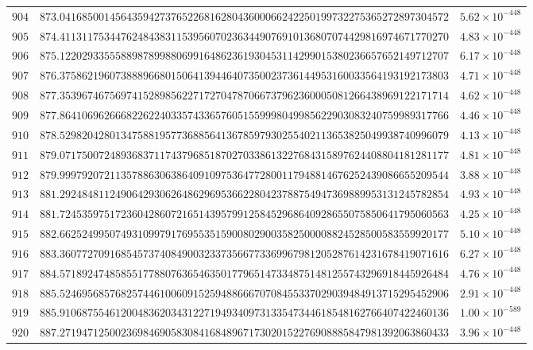\documentclass[12pt,reqno]{amsart}
\theoremstyle{remark}
\begin{document}
\begin{longtable}{clc}
$904$ & $873.0416850014564359427376522681628043600066242250199732275365272897304572$ & $5.62\times 10^{-448}$ \\
$905$ & $874.4113117534476248438311539560702363449076910136807074429816974671770270$ & $4.83\times 10^{-448}$ \\
$906$ & $875.1220293355588987899880699164862361930453114299015380236657652149712707$ & $6.17\times 10^{-448}$ \\
$907$ & $876.3758621960738889668015064139446407350023736144953160033564193192173803$ & $4.71\times 10^{-448}$ \\
$908$ & $877.3539674675697415289856227172704787066737962360005081266438969122171714$ & $4.62\times 10^{-448}$ \\
$909$ & $877.8641069626668226224033574336576051559998049985622903083240759989317766$ & $4.46\times 10^{-448}$ \\
$910$ & $878.5298204280134758819577368856413678597930255402113653825049938740996079$ & $4.13\times 10^{-448}$ \\
$911$ & $879.0717500724893683711743796851870270338613227684315897624408804181281177$ & $4.81\times 10^{-448}$ \\
$912$ & $879.9997920721135788630638640910975364772800117948814676252439086655209544$ & $3.88\times 10^{-448}$ \\
$913$ & $881.2924848112490642930626486296953662280423788754947369889953131245782854$ & $4.93\times 10^{-448}$ \\
$914$ & $881.7245359751723604286072165143957991258452968640928655075850641795060563$ & $4.25\times 10^{-448}$ \\
$915$ & $882.6625249950749310997917695535159008029003582500008824528500583559920177$ & $5.10\times 10^{-448}$ \\
$916$ & $883.3607727091685457374084900323373566773369967981205287614231678419071616$ & $6.27\times 10^{-448}$ \\
$917$ & $884.5718924748585517788076365463501779651473348751481255743296918445926484$ & $4.76\times 10^{-448}$ \\
$918$ & $885.5246956857682574461006091525948866670708455337029039484913715295452906$ & $2.91\times 10^{-448}$ \\
$919$ & $885.9106875546120048362034312271949340973133547344618548162766407422460136$ & $1.00\times 10^{-589}$ \\
$920$ & $887.2719471250023698469058308416848967173020152276908885847981392063860433$ & $3.96\times 10^{-448}$ \\

\end{longtable}
\end{document}
